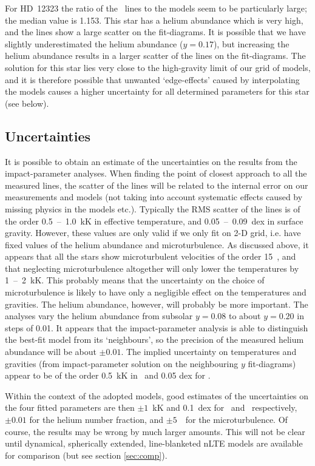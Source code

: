 For HD~12323 the ratio of the \hei\ lines to the models seem to be
particularly large; the median value is 1.153. This star has a helium
abundance which is very high, and the lines show a large scatter on
the fit-diagrams. It is possible that we have slightly underestimated
the helium abundance ($y = 0.17$), but increasing the helium abundance
results in a larger scatter of the lines on the fit-diagrams. The
solution for this star lies very close to the high-gravity limit of
our grid of models, and it is therefore possible that unwanted
`edge-effects' caused by interpolating the models causes a higher
uncertainty for all determined parameters for this star (see below).


\subsection{Uncertainties}
\label{sec:analyses:err}

It is possible to obtain an estimate of the uncertainties on the
results from the impact-parameter analyses. When finding the
point of closest approach to all the measured lines, the scatter of
the lines will be related to the internal error on our measurements
and models (not taking into account systematic effects caused by
missing physics in the models etc.). Typically the RMS scatter of the
lines is of the order 0.5~--~1.0~kK in effective temperature, and
0.05~--~0.09~dex in surface gravity. However, these values are only
valid if we only fit on 2-D grid, i.e. have fixed values of the helium
abundance and microturbulence. As discussed above, it appears that all
the stars show microturbulent velocities of the order 15~\kms, and
that neglecting microturbulence altogether will only lower the
temperatures by 1~--~2~kK. This probably means that the uncertainty on
the choice of microturbulence is likely to have only a negligible effect
on the temperatures and gravities. The helium abundance, however, will
probably be more important. The analyses vary the helium abundance
from subsolar $y = 0.08$ to about $y = 0.20$ in steps of 0.01. It
appears that the impact-parameter analysis is able to distinguish the
best-fit model from its `neighbours', so the precision of the
measured helium abundance will be about $\pm 0.01$. The implied uncertainty
on temperatures and gravities (from impact-parameter solution on the
neighbouring $y$ fit-diagrams) appear to be of the order 0.5~kK in
\teff\ and 0.05 dex for \logg. 

Within the context of the adopted models, good estimates of the
uncertainties on the four fitted parameters are then $\pm 1$~kK and
0.1~dex for \teff\ and \logg\ respectively, $\pm 0.01$ for the helium
number fraction, and $\pm 5$~\kms\ for the microturbulence. Of course,
the results may be wrong by much larger amounts. This will not be
clear until dynamical, spherically extended, line-blanketed nLTE
models are available for comparison (but see section \ref{sec:comp}).

